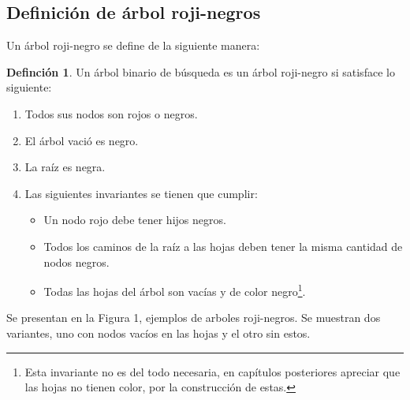 \documentclass[letterpaper,12pt,oneside]{book}
\newcommand{\arn}{árbol roji-negro}
\newcommand{\arns}{arboles roji-negros}
\theoremstyle{plain}
\theoremstyle{definition}
\newtheorem{defn}{Definci\'on}[section]
\theoremstyle{remark}
\begin{document}
\subsection{Definici\'on de {{{{\arn}}}s}}
Un {{{\arn}}} se define de la siguiente manera:
\begin{defn}
Un \'arbol binario de búsqueda es un {{{\arn}}} si satisface lo siguiente:
\begin{enumerate}
    \item Todos sus nodos son rojos o negros.
    \item El \'arbol vació es negro.
    \item La raíz es negra.
    \item Las siguientes invariantes se tienen que cumplir:
    \begin{itemize}
        \item Un nodo rojo debe tener hijos negros.
        \item Todos los caminos de la raíz a las hojas deben tener la misma cantidad de nodos negros.
        \item Todas las hojas del \'arbol son vacías y de color negro\footnote{Esta invariante no es del 
        todo necesaria, en capítulos posteriores apreciar que las hojas no tienen color, por la 
        construcción de estas.}.
    \end{itemize}
\end{enumerate}
\end{defn}
Se presentan en la Figura 1, ejemplos de {\arns}. Se muestran dos variantes, uno con nodos vacíos en las 
hojas y el otro sin estos.
\end{document}
